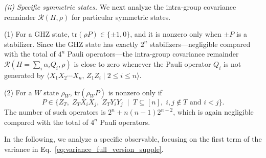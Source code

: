 \documentclass[prl,aps,notitlepage,superscriptaddress,showpacs,nofootinbib]{revtex4-2}
\begin{document}
\textit{(ii) Specific symmetric states.} We next analyze the intra-group covariance remainder $\mathcal{R}(H,\rho)$ for particular symmetric states.  

(1) For a GHZ state, $\text{tr}(\rho P) \in \{\pm 1,0\}$, and it is nonzero only when $\pm P$ is a stabilizer. Since the GHZ state has exactly $2^n$ stabilizers—negligible compared with the total of $4^n$ Pauli operators—the intra-group covariance remainder $\mathcal{R}(H=\sum_i \alpha_i Q_i,\rho)$ is close to zero whenever the Pauli operator $Q_i$ is not generated by $\langle X_1X_2\cdots X_n,\, Z_1Z_i \mid 2 \leq i \leq n \rangle$.  

(2) For a $W$ state $\rho_W$, $\text{tr}(\rho_W P)$ is nonzero only if  
\[
    P \in \{ Z_T,\; Z_T X_i X_j,\; Z_T Y_i Y_j \;\mid\; T \subseteq [n],\; i,j \notin T \text{ and } i< j \}.
\]  
The number of such operators is $2^n + n(n-1)2^{n-2}$, which is again negligible compared with the total of $4^n$ Pauli operators.




In the following, we analyze a specific observable, focusing on the first term of the variance in Eq.~\eqref{eq:variance_full_version_supple}.  
\end{document}
